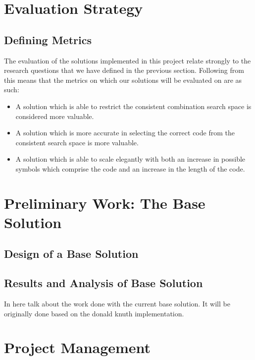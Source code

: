 \documentclass[12pt]{article}  %
\theoremstyle{definition}
\theoremstyle{remark}
\begin{document}
\newpage                     %
\section{Evaluation Strategy}\label{ss:back}

\subsection {Defining Metrics}

The evaluation of the solutions implemented in this project relate strongly to the research questions that we have defined in the previous section. Following from this means that the metrics on which our solutions will be evaluated on are as such:
\begin {itemize}
	\item {A solution which is able to restrict the consistent combination search space is considered more valuable.}
	\item {A solution which is more accurate in selecting the correct code from the consistent search space is more valuable.}
	\item {A solution which is able to scale elegantly with both an increase in possible symbols which comprise the code and an increase in the length of the code.}
\end{itemize}

\newpage
\section {Preliminary Work: The Base Solution}

\subsection {Design of a Base Solution}

\subsection {Results and Analysis of Base Solution}
In here talk about the work done with the current base solution. It will be originally done based on the donald knuth implementation.


\newpage                     %
\section{Project Management}\label{ss:back}
\end{document}
